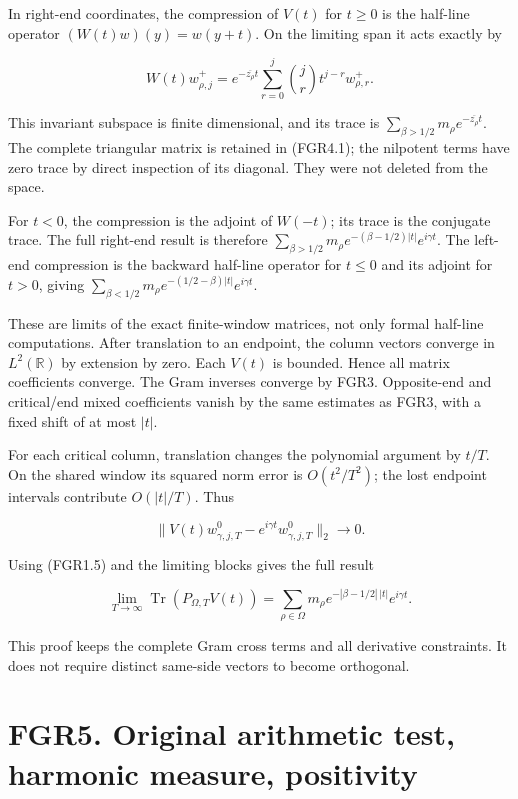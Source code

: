 In right-end coordinates, the compression of \(V(t)\) for \(t\geq0\) is
the half-line operator \((W(t)w)(y)=w(y+t)\). On the limiting span it
acts exactly by

\[
 W(t)w^+_{\rho,j}
 =e^{-\overline{z_\rho}t}
   \sum_{r=0}^j\binom jr t^{j-r}w^+_{\rho,r}.
\tag{FGR4.1}
\]

This invariant subspace is finite dimensional, and its trace is
\(\sum_{\beta>1/2}m_\rho e^{-\overline{z_\rho}t}\). The complete
triangular matrix is retained in (FGR4.1); the nilpotent terms have zero
trace by direct inspection of its diagonal. They were not deleted from
the space.

For \(t<0\), the compression is the adjoint of \(W(-t)\); its trace is
the conjugate trace. The full right-end result is therefore
\(\sum_{\beta>1/2}m_\rho e^{-(\beta-1/2)|t|}e^{i\gamma t}\). The
left-end compression is the backward half-line operator for \(t\leq0\)
and its adjoint for \(t>0\), giving
\(\sum_{\beta<1/2}m_\rho e^{-(1/2-\beta)|t|}e^{i\gamma t}\).

These are limits of the exact finite-window matrices, not only formal
half-line computations. After translation to an endpoint, the column
vectors converge in \(L^2(\mathbb R)\) by extension by zero. Each
\(V(t)\) is bounded. Hence all matrix coefficients converge. The Gram
inverses converge by FGR3. Opposite-end and critical/end mixed
coefficients vanish by the same estimates as FGR3, with a fixed shift of
at most \(|t|\).

For each critical column, translation changes the polynomial argument by
\(t/T\). On the shared window its squared norm error is \(O(t^2/T^2)\);
the lost endpoint intervals contribute \(O(|t|/T)\). Thus

\[
 \|V(t)w^0_{\gamma,j,T}-e^{i\gamma t}w^0_{\gamma,j,T}\|_2\longrightarrow0.
\]

Using (FGR1.5) and the limiting blocks gives the full result

\[
 \boxed{\lim_{T\to\infty}\operatorname{Tr}(P_{\Omega,T}V(t))
 =\sum_{\rho\in\Omega}m_\rho
 e^{-|\beta-1/2|\,|t|}e^{i\gamma t}.}
\tag{FGR4.2}
\]

This proof keeps the complete Gram cross terms and all derivative
constraints. It does not require distinct same-side vectors to become
orthogonal.

\section{FGR5. Original arithmetic test, harmonic measure,
positivity}\label{fgr5.-original-arithmetic-test-harmonic-measure-positivity}

